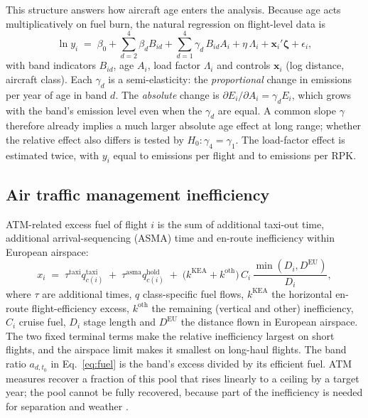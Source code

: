 \documentclass[preprint, 12pt, authoryear]{elsarticle}
\begin{document}
This structure answers how aircraft age enters the analysis. Because age acts
multiplicatively on fuel burn, the natural regression on flight-level data is
\begin{equation}
\label{eq:reg}
\ln y_i \;=\; \beta_0 + \sum_{d=2}^{4}\beta_d B_{id} + \sum_{d=1}^{4}\gamma_d\,B_{id}A_i
+ \eta\,\Lambda_i + \mathbf{x}_i'\boldsymbol{\zeta} + \epsilon_i,
\end{equation}
with band indicators $B_{id}$, age $A_i$, load factor $\Lambda_i$ and controls
$\mathbf{x}_i$ (log distance, aircraft class). Each $\gamma_d$ is a
semi-elasticity: the \emph{proportional} change in emissions per year of age in
band $d$. The \emph{absolute} change is $\partial E_i/\partial A_i = \gamma_d
E_i$, which grows with the band's emission level even when the $\gamma_d$ are
equal. A common slope $\gamma$ therefore already implies a much larger absolute
age effect at long range; whether the relative effect also differs is tested
by $H_0\!:\gamma_4=\gamma_1$. The load-factor effect is estimated twice, with
$y_i$ equal to emissions per flight and to emissions per RPK.

\subsection{Air traffic management inefficiency}
\label{sec:atm}

ATM-related excess fuel of flight $i$ is the sum of additional taxi-out time,
additional arrival-sequencing (ASMA) time and en-route inefficiency within
European airspace:
\begin{equation}
\label{eq:atm}
x_i \;=\; \tau^{\mathrm{taxi}} q^{\mathrm{taxi}}_{c(i)} \;+\; \tau^{\mathrm{asma}} q^{\mathrm{hold}}_{c(i)}
\;+\; \bigl(k^{\mathrm{KEA}} + k^{\mathrm{oth}}\bigr)\, C_i\,\frac{\min(D_i, D^{\mathrm{EU}})}{D_i},
\end{equation}
where $\tau$ are additional times, $q$ class-specific fuel flows, $k^{\mathrm{KEA}}$
the horizontal en-route flight-efficiency excess, $k^{\mathrm{oth}}$ the
remaining (vertical and other) inefficiency, $C_i$ cruise fuel, $D_i$ stage
length and $D^{\mathrm{EU}}$ the distance flown in European airspace. The two
fixed terminal terms make the relative inefficiency largest on short flights,
and the airspace limit makes it smallest on long-haul flights. The band ratio
$a_{d,t_0}$ in Eq.~\eqref{eq:fuel} is the band's excess divided by its efficient
fuel. ATM measures recover a fraction of this pool that rises linearly to a
ceiling by a target year; the pool cannot be fully recovered, because part of
the inefficiency is needed for separation and weather \citep{prc2021}.
\end{document}

